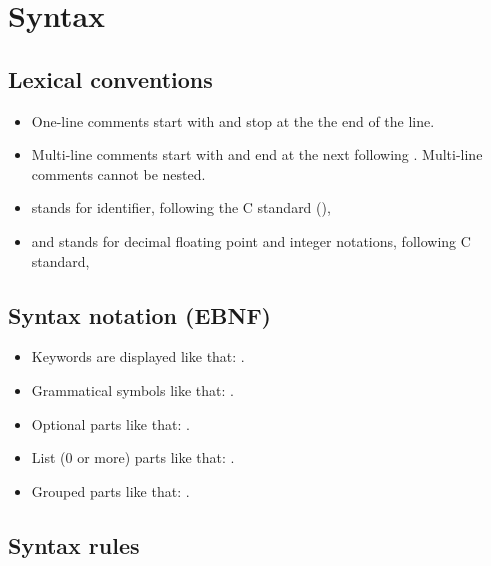 
\section{Syntax}




\subsection{Lexical conventions}

\begin{itemize}
\item
One-line comments start with \key{--} and  stop at the the end of the
line.
\item
Multi-line comments start with \key{(*} and end at the next following
\key{*)}. Multi-line comments cannot be nested.
\item
{} stands for identifier, following the C standard
(\bnftoken{[\_a-zA-Z][\_a-zA-Z0-9]*}),
\item
{} and  stands for decimal floating point and integer
notations, following C standard,
\end{itemize}

\subsection{Syntax notation (EBNF)}
\begin{itemize}
\item Keywords are displayed like that: .
\item Grammatical symbols like that: .
\item Optional parts like that: .
\item List (0 or more)  parts like that: .
\item Grouped parts like that: .
\end{itemize}


\subsection{Syntax rules}


